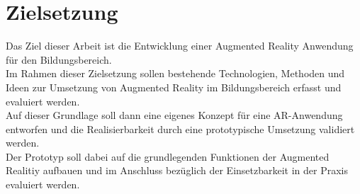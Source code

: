 \section{Zielsetzung}\label{sec:ziele}
Das Ziel dieser Arbeit ist die Entwicklung einer Augmented Reality Anwendung für den Bildungsbereich. \\
Im Rahmen dieser Zielsetzung sollen bestehende Technologien, Methoden und Ideen zur Umsetzung von Augmented Reality im Bildungsbereich erfasst und evaluiert werden. \\
Auf dieser Grundlage soll dann eine eigenes Konzept für eine AR-Anwendung entworfen und die Realisierbarkeit durch eine prototypische Umsetzung validiert werden. \\
Der Prototyp soll dabei auf die grundlegenden Funktionen der Augmented Realitiy aufbauen und im Anschluss bezüglich der Einsetzbarkeit in der Praxis evaluiert werden. 

